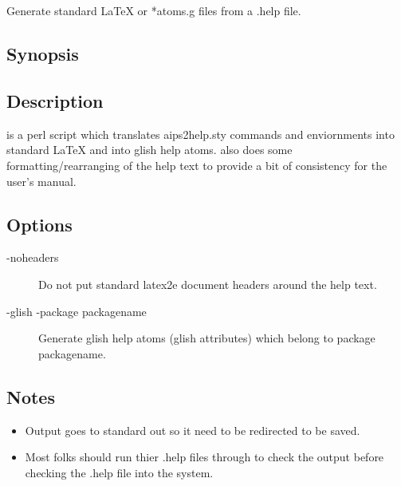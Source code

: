 \newpage
\section{}
\label{system:help2tex}

Generate standard LaTeX or *atoms.g files from a .help file.

\subsection*{Synopsis}
 
\begin{synopsis}
\end{synopsis}
 
\subsection*{Description}
 
 is a perl script which translates aips2help.sty commands and
enviornments into standard LaTeX and into glish help atoms.  also
does some formatting/rearranging of the help text to provide a bit of
consistency for the user's manual.
 
\subsection*{Options}

 
\begin{description}
\item[-noheaders] Do not put standard latex2e document headers around the help text.
\item[-glish -package packagename] Generate glish help atoms (glish
attributes) which belong to package packagename.
\end{description}
 
\subsection*{Notes}
 
\begin{itemize}
\item Output goes to standard out so it need to be redirected to be saved.

\item Most folks should run thier .help files through  to check
the output before checking the .help file into the system.
\end{itemize}

